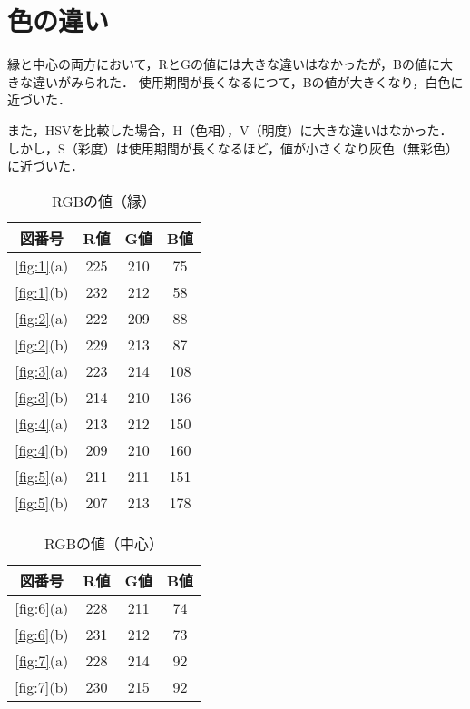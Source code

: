 \documentclass[main]{subfiles}
\begin{document}
\section{色の違い}

縁と中心の両方において，RとGの値には大きな違いはなかったが，Bの値に大きな違いがみられた．
使用期間が長くなるにつて，Bの値が大きくなり，白色に近づいた．

また，HSVを比較した場合，H（色相），V（明度）に大きな違いはなかった．
しかし，S（彩度）は使用期間が長くなるほど，値が小さくなり灰色（無彩色）に近づいた．


\begin{table}[h]
    \caption{RGBの値（縁）}
    \label{table:RGB1}
    \centering
\begin{tabular}{c|c|c|c}
    図番号 & R値 & G値 & B値 \\ \hline
    \ref{fig:1}(a) & 225 & 210 & 75 \\ \hline
   \ref{fig:1}(b) & 232 & 212 & 58 \\ \hline\hline
   \ref{fig:2}(a) & 222 & 209 & 88 \\ \hline
   \ref{fig:2}(b) & 229 & 213 & 87 \\ \hline
   \ref{fig:3}(a) & 223 & 214 & 108 \\ \hline
   \ref{fig:3}(b) & 214 & 210 & 136 \\ \hline\hline
   \ref{fig:4}(a) & 213 & 212 & 150 \\ \hline
   \ref{fig:4}(b) & 209 & 210 & 160 \\ \hline
   \ref{fig:5}(a) & 211 & 211 & 151 \\ \hline
   \ref{fig:5}(b) & 207 & 213 & 178 \\ 
\end{tabular}    
\end{table}

\begin{table}[h]
    \caption{RGBの値（中心）}
    \label{table:RGB2}
    \centering
\begin{tabular}{c|c|c|c}
    図番号 & R値 & G値 & B値 \\ \hline
   \ref{fig:6}(a) & 228 & 211 & 74 \\ \hline
   \ref{fig:6}(b) & 231 & 212 & 73 \\ \hline\hline
   \ref{fig:7}(a) & 228 & 214 & 92 \\ \hline
   \ref{fig:7}(b) & 230 & 215 & 92 \\ 
\end{tabular}    
\end{table}
\end{document}
